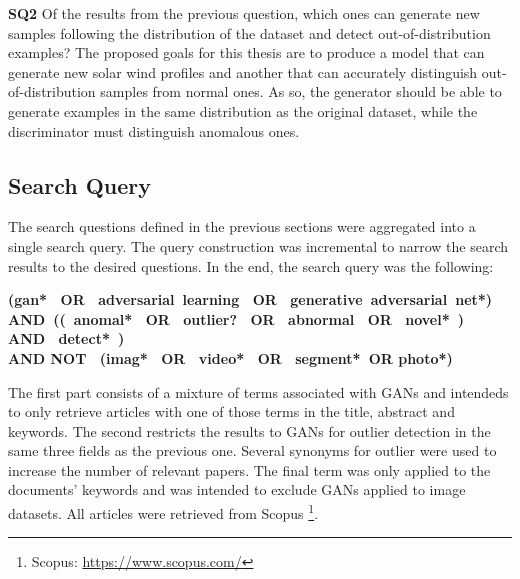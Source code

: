 \noindent\textbf{SQ2} Of the results from the previous question, which ones can generate new samples following the distribution of the dataset and detect out-of-distribution examples? The proposed goals for this thesis are to produce a model that can generate new solar wind profiles and another that can accurately distinguish out-of-distribution samples from normal ones. As so, the generator should be able to generate examples in the same distribution as the original dataset, while the discriminator must distinguish anomalous ones.

\subsection{Search Query}\label{sec:gan_search_queries}
The search questions defined in the previous sections were aggregated into a single search query. The query construction was incremental to narrow the search results to the desired questions. In the end, the search query was the following:
\begin{center}
\textbf{(gan*  OR  adversarial learning  OR  generative adversarial net*) \\ AND (( anomal*  OR  outlier?  OR  abnormal  OR  novel* )  AND  detect* ) \\ AND NOT  (imag*  OR  video*  OR  segment* OR photo*)}
\end{center}

The first part consists of a mixture of terms associated with GANs and intendeds to only retrieve articles with one of those terms in the title, abstract and keywords. The second restricts the results to GANs for outlier detection in the same three fields as the previous one. Several synonyms for outlier were used to increase the number of relevant papers. The final term was only applied to the documents' keywords and was intended to exclude GANs applied to image datasets. All articles were retrieved from Scopus \footnote{Scopus: \url{https://www.scopus.com/}}.


